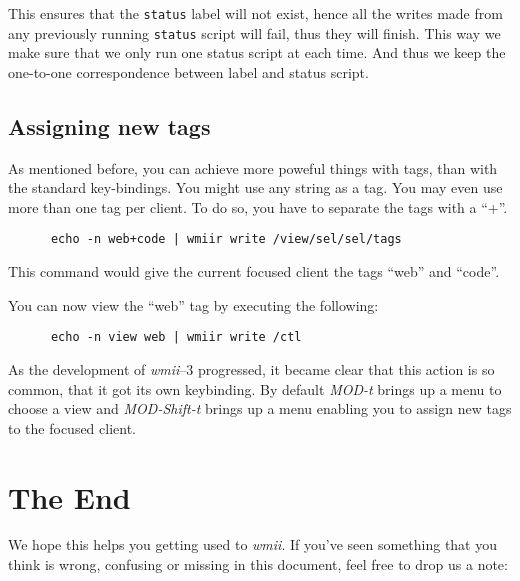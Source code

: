 \documentclass[12pt,a4paper]{article} %
\newcommand{\wmii}{\emph{wmii}}
\begin{document}
    This ensures that the \verb+status+ label will not exist, hence all
    the writes made from any previously running \verb+status+ script
    will fail, thus they will finish. This way we make sure that
    we only run one status script at each time.  And thus we keep the
    one-to-one correspondence between label and status script.
    
    \subsection{Assigning new tags}
    
    As mentioned before, you can achieve more poweful things with tags, than
    with the standard key-bindings. You might use any string as a tag. You may
    even use more than one tag per client. To do so, you have to separate the
    tags with a ``+''.

    \begin{verbatim}
      echo -n web+code | wmiir write /view/sel/sel/tags
    \end{verbatim}

    This command would give the current focused client the tags
    ``web'' and ``code''.
    
    You can now view the ``web'' tag by executing the following:

    \begin{verbatim}
      echo -n view web | wmiir write /ctl
    \end{verbatim}

    As the development of \wmii --3 progressed, it became clear that this
    action is so common, that it got its own keybinding. By default
    \emph{MOD-t} brings up a menu to choose a view and
    \emph{MOD-Shift-t} brings up a menu enabling you to assign new
    tags to the focused client.


    \section{The End}
    \label{sec:end}
    
    We hope this helps you getting used to \wmii.
    If you've seen something that you think is wrong, confusing or missing in
    this document, feel free to drop us a note:
\end{document}

